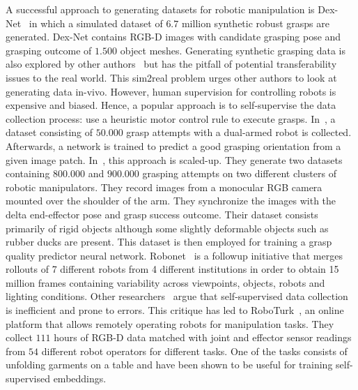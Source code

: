 \documentclass[\home/main.tex]{subfiles}
\begin{document}
A successful approach to generating datasets for robotic manipulation is Dex-Net~\autocite{dexnet2} in which a simulated dataset of $6.7$ million synthetic robust grasps are generated. Dex-Net contains RGB-D images with candidate grasping pose and grasping outcome of $1.500$ object meshes. Generating synthetic grasping data is also explored by other authors~\autocite{depierre2018jacquard,redmon2015real} but has the pitfall of potential transferability issues to the real world. This sim2real problem urges other authors to look at generating data in-vivo. However, human supervision for controlling robots is expensive and biased. Hence, a popular approach is to self-supervise the data collection process: use a heuristic motor control rule to execute grasps. In~\autocite{pinto2016supersizing}, a dataset consisting of $50.000$ grasp attempts with a dual-armed robot is collected. Afterwards, a network is trained to predict a good grasping orientation from a given image patch. 
In~\autocite{Levine2016}, this approach is scaled-up. They generate two datasets containing $800.000$ and $900.000$ grasping attempts on two different clusters of robotic manipulators. They record images from a monocular RGB camera mounted over the shoulder of the arm. They synchronize the images with the delta end-effector pose and grasp success outcome. Their dataset consists primarily of rigid objects although some slightly deformable objects such as rubber ducks are present. This dataset is then employed for training a grasp quality predictor neural network. 
Robonet~\autocite{dasari2019robonet} is a followup initiative that merges rollouts of 7 different robots from 4 different institutions in order to obtain 15 million frames containing variability across viewpoints, objects, robots and lighting conditions.
Other researchers~\autocite{mandlekar2018roboturk} argue that self-supervised data collection is inefficient and prone to errors. This critique has led to RoboTurk~\autocite{mandlekar2018roboturk}, an online platform that allows remotely operating robots for manipulation tasks. They collect $111$ hours of RGB-D data matched with joint and effector sensor readings from $54$ different robot operators for different tasks. One of the tasks consists of unfolding garments on a table and have been shown to be useful for training self-supervised embeddings. 
\end{document}
